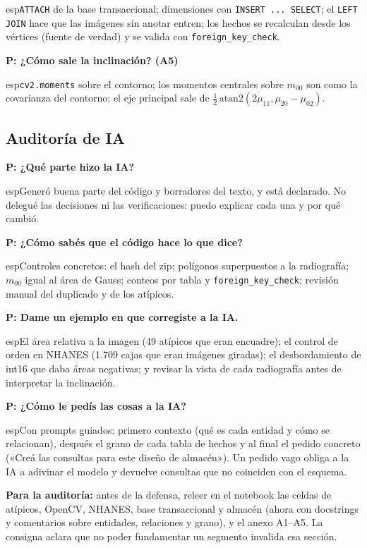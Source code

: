 \documentclass[11pt,a4paper]{article}
\newcommand{\preg}[1]{\par\medskip\textbf{P: #1}\par\nopagebreak}
\begin{document}
esp{\texttt{ATTACH} de la base transaccional; dimensiones con \texttt{INSERT ... SELECT}; el \texttt{LEFT JOIN} hace que las imágenes sin anotar entren; los hechos se recalculan desde los vértices (fuente de verdad) y se valida con \texttt{foreign\_key\_check}.}
\preg{¿Cómo sale la inclinación? (A5)}

esp{\texttt{cv2.moments} sobre el contorno; los momentos centrales sobre $m_{00}$ son como la covarianza del contorno; el eje principal sale de $\frac12\,\mathrm{atan2}(2\mu_{11},\mu_{20}-\mu_{02})$.}

\subsection*{Auditoría de IA}
\preg{¿Qué parte hizo la IA?}

esp{Generó buena parte del código y borradores del texto, y está declarado. No delegué las decisiones ni las verificaciones: puedo explicar cada una y por qué cambió.}
\preg{¿Cómo sabés que el código hace lo que dice?}

esp{Controles concretos: el hash del zip; polígonos superpuestos a la radiografía; $m_{00}$ igual al área de Gauss; conteos por tabla y \texttt{foreign\_key\_check}; revisión manual del duplicado y de los atípicos.}
\preg{Dame un ejemplo en que corregiste a la IA.}

esp{El área relativa a la imagen (49 atípicos que eran encuadre); el control de orden en NHANES (1.709 cajas que eran imágenes giradas); el desbordamiento de int16 que daba áreas negativas; y revisar la vista de cada radiografía antes de interpretar la inclinación.}
\preg{¿Cómo le pedís las cosas a la IA?}

esp{Con prompts guiados: primero contexto (qué es cada entidad y cómo se relacionan), después el grano de cada tabla de hechos y al final el pedido concreto («Creá las consultas para este diseño de almacén»). Un pedido vago obliga a la IA a adivinar el modelo y devuelve consultas que no coinciden con el esquema.}

\bigskip
\textbf{Para la auditoría:} antes de la defensa, releer en el notebook las celdas de atípicos, OpenCV, NHANES, base transaccional y almacén (ahora con docstrings y comentarios sobre entidades, relaciones y grano), y el anexo A1--A5. La consigna aclara que no poder fundamentar un segmento invalida esa sección.
\end{document}
